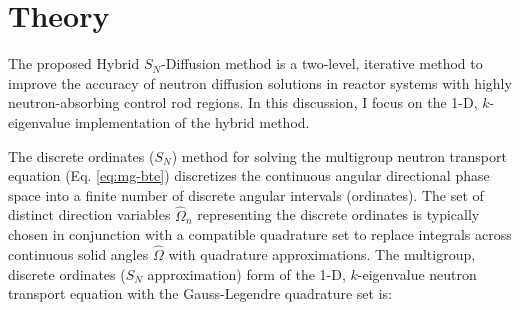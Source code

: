 \section{Theory} \label{sec:hybrid-theory}

The proposed Hybrid $S_N$-Diffusion method is a two-level, iterative method to improve the
accuracy of neutron diffusion solutions in reactor systems with highly neutron-absorbing control
rod regions. In this discussion, I focus on the 1-D, $k$-eigenvalue implementation of the
hybrid method.

The discrete ordinates ($S_N$) method for solving the multigroup neutron transport equation
(Eq. \ref{eq:mg-bte}) discretizes the continuous angular directional phase space into a finite
number of discrete angular intervals (ordinates). The set of distinct direction variables
$\hat{\Omega}_n$ representing the discrete ordinates is typically chosen in conjunction with a
compatible quadrature set to replace integrals across continuous solid angles
$\hat{\Omega}$ with quadrature approximations. The multigroup, discrete ordinates ($S_N$
approximation) form of the 1-D, $k$-eigenvalue neutron transport equation with the Gauss-Legendre
quadrature set is:
%
